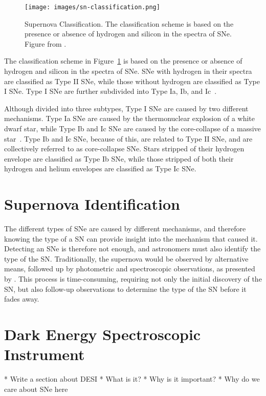 \begin{figure}[ht]
    \centering
    \texttt{[image: images/sn-classification.png]}
    \caption[Supernova Classification]{Supernova Classification. The 
    classification scheme is based on the presence or absence of hydrogen and 
    silicon in the spectra of SNe. Figure from \textcite{Turatto2003}.}
    \label{fig:sn-classification}
\end{figure}

The classification scheme in Figure~\ref{fig:sn-classification} is based on
the presence or absence of hydrogen and silicon in the spectra of SNe.
SNe with hydrogen in their spectra are classified as Type II SNe, while those
without hydrogen are classified as Type I SNe. Type I SNe are further
subdivided into Type Ia, Ib, and Ic~\parencite{Turatto2003}. 

Although divided into three subtypes, Type I SNe are caused by two 
different mechanisms. Type Ia SNe are caused by the thermonuclear explosion
of a white dwarf star, while Type Ib and Ic SNe are caused by the core-collapse
of a massive star~\parencite{Filippenko1997}. Type Ib and Ic SNe, because of this, 
are related to Type II SNe, and are collectively referred to as core-collapse
SNe. Stars stripped of their hydrogen envelope are classified as Type Ib SNe, 
while those stripped of both their hydrogen and helium envelopes are classified
as Type Ic SNe. 

\section{Supernova Identification}
\label{sec:supernova-identification}
The different types of SNe are caused by different mechanisms, and therefore 
knowing the type of a SN can provide insight into the mechanism that caused it.
Detecting an SNe is therefore not enough, and astronomers must also identify the
type of the SN. Traditionally, the supernova would be observed by alternative 
means, followed up by photometric and spectroscopic observations, as presented by 
\textcite{Perlmutter1999}. This process is time-consuming, requiring not only 
the initial discovery of the SN, but also follow-up observations to determine
the type of the SN before it fades away. 

\section{Dark Energy Spectroscopic Instrument}
\label{sec: DESI}
* Write a section about DESI
* What is it?
* Why is it important?
* Why do we care about SNe here

